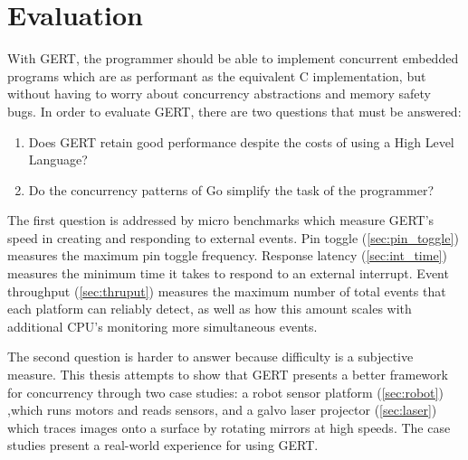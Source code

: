 \chapter{Evaluation}

With GERT, the programmer should be able to implement concurrent embedded programs
which are as performant as the equivalent C implementation, but without having to
worry about concurrency abstractions and memory safety bugs. In order to evaluate GERT,
there are two questions that must be answered:

\begin{enumerate}
  \item Does GERT retain good performance despite the costs of using a High Level Language?
  \item Do the concurrency patterns of Go simplify the task of the programmer?
\end{enumerate}

The first question is addressed by micro benchmarks which measure GERT's
speed in creating and responding to external events. Pin toggle (\ref{sec:pin_toggle})
measures the maximum pin toggle frequency. Response latency (\ref{sec:int_time})
measures the minimum time it takes to respond to an external interrupt. Event
throughput (\ref{sec:thruput}) measures the maximum number of total events that each platform
can reliably detect, as well as how this amount scales with additional CPU's monitoring
more simultaneous events.


The second question is harder to answer because difficulty is a subjective
measure. This thesis attempts to show that GERT presents a better framework for
concurrency through two case studies: a robot sensor platform (\ref{sec:robot})
,which runs motors and reads sensors, and a galvo laser projector (\ref{sec:laser})
which traces images onto a surface by rotating mirrors at high speeds. The case studies
present a real-world experience for using GERT.

